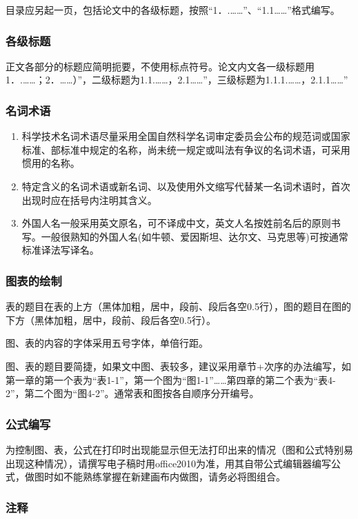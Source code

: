 目录应另起一页，包括论文中的各级标题，按照“1．.……”、“1.1……”格式编写。

\subsubsection{各级标题}
正文各部分的标题应简明扼要，不使用标点符号。论文内文各一级标题用1．.……；2．……）”，二级标题为1.1.……，2.1……”，三级标题为1.1.1.……，2.1.1……”

\subsubsection{名词术语}

\begin{enumerate}
    \item 科学技术名词术语尽量采用全国自然科学名词审定委员会公布的规范词或国家标准、部标准中规定的名称，尚未统一规定或叫法有争议的名词术语，可采用惯用的名称。
    \item 特定含义的名词术语或新名词、以及使用外文缩写代替某一名词术语时，首次出现时应在括号内注明其含义。
    \item 外国人名一般采用英文原名，可不译成中文，英文人名按姓前名后的原则书写。一般很熟知的外国人名(如牛顿、爱因斯坦、达尔文、马克思等)可按通常标准译法写译名。
    
\end{enumerate}
\subsubsection{图表的绘制}

表的题目在表的上方（黑体加粗，居中，段前、段后各空0.5行），图的题目在图的下方（黑体加粗，居中，段前、段后各空0.5行）。

图、表的内容的字体采用五号字体，单倍行距。

图、表的题目要简捷，如果文中图、表较多，建议采用章节+次序的办法编写，如第一章的第一个表为“表1-1”，第一个图为“图1-1”……第四章的第二个表为“表4-2”，第二个图为“图4-2”。通常表和图按各自顺序分开编号。

\subsubsection{公式编写}
为控制图、表，公式在打印时出现能显示但无法打印出来的情况（图和公式特别易出现这种情况），请撰写电子稿时用office2010为准，用其自带公式编辑器编写公式，做图时如不能熟练掌握在新建画布内做图，请务必将图组合。

\subsubsection{注释}

